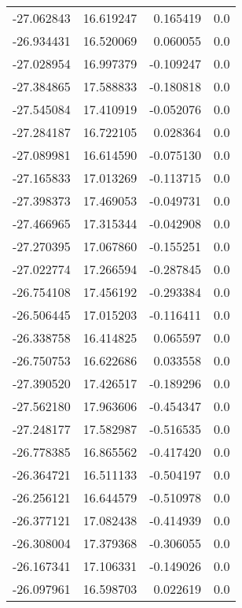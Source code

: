 \begin{tabular}{rrrr}
      -27.062843 &        16.619247 &    0.165419 &   0.0 \\
      -26.934431 &        16.520069 &    0.060055 &   0.0 \\
      -27.028954 &        16.997379 &   -0.109247 &   0.0 \\
      -27.384865 &        17.588833 &   -0.180818 &   0.0 \\
      -27.545084 &        17.410919 &   -0.052076 &   0.0 \\
      -27.284187 &        16.722105 &    0.028364 &   0.0 \\
      -27.089981 &        16.614590 &   -0.075130 &   0.0 \\
      -27.165833 &        17.013269 &   -0.113715 &   0.0 \\
      -27.398373 &        17.469053 &   -0.049731 &   0.0 \\
      -27.466965 &        17.315344 &   -0.042908 &   0.0 \\
      -27.270395 &        17.067860 &   -0.155251 &   0.0 \\
      -27.022774 &        17.266594 &   -0.287845 &   0.0 \\
      -26.754108 &        17.456192 &   -0.293384 &   0.0 \\
      -26.506445 &        17.015203 &   -0.116411 &   0.0 \\
      -26.338758 &        16.414825 &    0.065597 &   0.0 \\
      -26.750753 &        16.622686 &    0.033558 &   0.0 \\
      -27.390520 &        17.426517 &   -0.189296 &   0.0 \\
      -27.562180 &        17.963606 &   -0.454347 &   0.0 \\
      -27.248177 &        17.582987 &   -0.516535 &   0.0 \\
      -26.778385 &        16.865562 &   -0.417420 &   0.0 \\
      -26.364721 &        16.511133 &   -0.504197 &   0.0 \\
      -26.256121 &        16.644579 &   -0.510978 &   0.0 \\
      -26.377121 &        17.082438 &   -0.414939 &   0.0 \\
      -26.308004 &        17.379368 &   -0.306055 &   0.0 \\
      -26.167341 &        17.106331 &   -0.149026 &   0.0 \\
      -26.097961 &        16.598703 &    0.022619 &   0.0 \\

\end{tabular}
